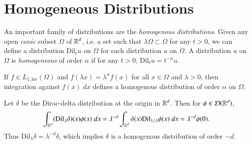 
\section{Homogeneous Distributions}

An important family of distributions are the \emph{homogenous distributions}. Given any open \emph{conic} subset $\Omega$ of $\operatorname{\mathbb{R}}^d$, i.e. a set such that $\lambda \Omega \subset \Omega$ for any $t > 0$, we can define a distribution $\text{Dil}_t u$ on $\Omega$ for each distribution $u$ on $\Omega$. A distribution $u$ on $\Omega$ is \emph{homogeneous} of order $\alpha$ if for any $t > 0$, $\text{Dil}_t u = t^{-\alpha} u$.

\begin{example}
    If $f \in L_{1,\text{loc}}(\Omega)$ and $f(\lambda x) = \lambda^\alpha f(x)$ for all $x \in \Omega$ and $\lambda > 0$, then integration against $f(x)\; dx$ defines a homogenous distribution of order $\alpha$ on $\Omega$.
\end{example}

\begin{example}
  Let $\delta$ be the Dirac-delta distribution at the origin in $\operatorname{\mathbb{R}}^d$. Then for $\phi \in \operatorname{\mathcal{D}}(\operatorname{\mathbb{R}}^d)$,
  \begin{align*}
    \int_{\operatorname{\mathbb{R}}^d} (\text{Dil}_\lambda \delta)(x) \phi(x)\; dx = \lambda^{-d} \int_{\operatorname{\mathbb{R}}^d} \delta(x) \text{Dil}_{1/\lambda} \phi(x)\; dx = \lambda^{-d} \phi(0).
  \end{align*}
  Thus $\text{Dil}_\lambda \delta = \lambda^{-d} \delta$, which implies $\delta$ is a homogenous distribution of order $-d$.
\end{example}

